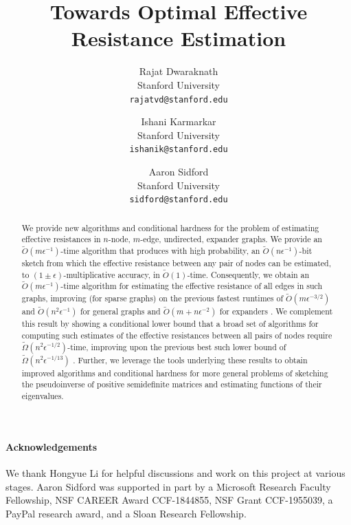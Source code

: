 \documentclass[11pt]{article}
\title{Towards Optimal Effective Resistance Estimation}
\author{Rajat Dwaraknath \\ Stanford University \\ \texttt{rajatvd@stanford.edu} \and Ishani Karmarkar \\ Stanford University \\ \texttt{ishanik@stanford.edu} \and Aaron Sidford \\ Stanford University \\ \texttt{sidford@stanford.edu}}
\date{}
\begin{document}
\maketitle

\begin{abstract}%
We provide new algorithms and conditional hardness for the problem of estimating effective resistances in $n$-node, $m$-edge, undirected, expander graphs. We provide an $\widetilde{O}(m\epsilon^{-1})$-time algorithm that produces with high probability, an $\widetilde{O}(n\epsilon^{-1})$-bit sketch from which the effective resistance between any pair of nodes can be estimated, to $(1 \pm \epsilon)$-multiplicative accuracy, in $\widetilde{O}(1)$-time. Consequently, we obtain an $\widetilde{O}(m\epsilon^{-1})$-time algorithm for estimating the effective resistance of all edges in such graphs, improving (for sparse graphs) on the previous fastest runtimes of $\widetilde{O}(m\epsilon^{-3/2})$ \cite{chu2018graph} and $\widetilde{O}(n^2\epsilon^{-1})$ \cite{JS2018} for general graphs and $\widetilde{O}(m + n\epsilon^{-2})$ for expanders \cite{li2022new}. 
We complement this result by showing a conditional lower bound that a broad set of algorithms for computing such estimates of the effective resistances between all pairs of nodes require $\widetilde{\Omega}(n^2 \epsilon^{-1/2})$-time, improving upon the previous best such lower bound of $\widetilde{\Omega}(n^2 \epsilon^{-1/13})$ \cite{musco2017spectrum}. Further, we leverage the tools underlying these results to obtain improved algorithms and conditional hardness for more general problems of sketching the pseudoinverse of positive semidefinite matrices and estimating functions of their eigenvalues.
\end{abstract}

\tableofcontents







\paragraph{Acknowledgements}
We thank Hongyue Li for helpful discussions and work on this project at various stages. Aaron Sidford was supported in part by a Microsoft Research Faculty Fellowship, NSF CAREER Award CCF-1844855, NSF Grant CCF-1955039, a PayPal research award, and a Sloan Research Fellowship. 



\end{document}

